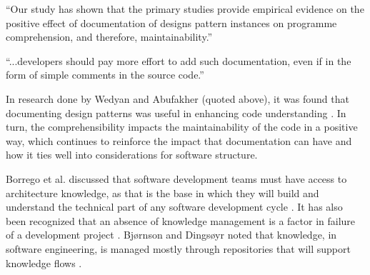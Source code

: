 \vspace{0.25cm}
\begin{displayquote}
  ``Our study has shown that the primary studies provide empirical evidence on the positive effect of documentation of designs pattern instances on programme comprehension, and therefore, maintainability.''
\end{displayquote}

\begin{displayquote}
  ``...developers should pay more effort to add such documentation, even if in the form of simple comments in the source code.''
\end{displayquote}
\vspace{0.25cm}

In research done by Wedyan and Abufakher (quoted above), it was found that documenting design patterns was useful in enhancing code understanding \cite{wedyan:2020}. In turn, the comprehensibility impacts the maintainability of the code in a positive way, which continues to reinforce the impact that documentation can have and how it ties well into considerations for software structure.

Borrego et al. discussed that software development teams must have access to architecture knowledge, as that is the base in which they will build and understand the technical part of any software development cycle \cite{borrego:2017}. It has also been recognized that an absence of knowledge management is a factor in failure of a development project \cite{borrego:2017}. 
Bjørnson and Dingsøyr noted that knowledge, in software engineering, is managed mostly through repositories that will support knowledge flows \cite{bjornson:2008}.
